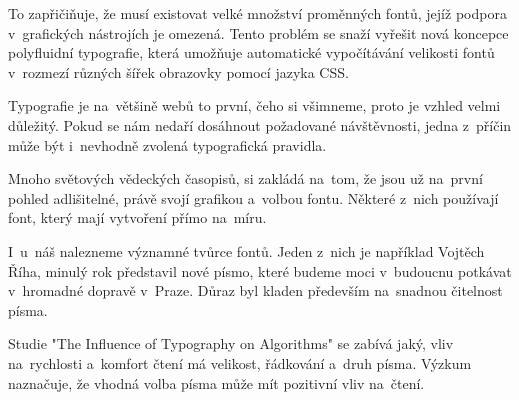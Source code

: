 \documentclass [11pt, a4paper] {article}
\begin{document}
    To zapřičiňuje, že musí existovat velké množství proměnných fontů, jejíž podpora v~grafických nástrojích je omezená. 
    Tento problém se snaží vyřešit nová koncepce polyfluidní typografie, která umožňuje automatické vypočítávání velikosti fontů v~rozmezí různých šířek obrazovky pomocí jazyka CSS. \cite{Zeman2019}

    Typografie je na~většině webů to první, čeho si všimneme, proto je vzhled velmi důležitý. Pokud se nám nedaří dosáhnout požadované návštěvnosti, jedna z~příčin může být i~nevhodně zvolená typografická pravidla. \cite{aira}

    Mnoho světových vědeckých časopisů, si zakládá na~tom, že jsou už na~první pohled adlišitelné, právě svojí grafikou a~volbou fontu. Některé z~nich používají font, který mají vytvoření přímo na~míru. \cite{Baldwin}
    
    I~u~náš nalezneme významné tvůrce fontů. Jeden z~nich je například Vojtěch Říha, minulý rok představil nové písmo, které budeme moci v~budoucnu potkávat v~hromadné dopravě v~Praze. Důraz byl kladen především na~snadnou čitelnost písma. \cite{Metro}

    Studie "The Influence of Typography on Algorithms" se zabívá jaký, vliv na~rychlosti a~komfort čtení má velikost, řádkování a~druh písma. Výzkum naznačuje, že vhodná volba písma může mít pozitivní vliv na~čtení. \cite{Vision}

    \newpage
    \renewcommand{\refname}{Literatura}
    
       
\end{document}
